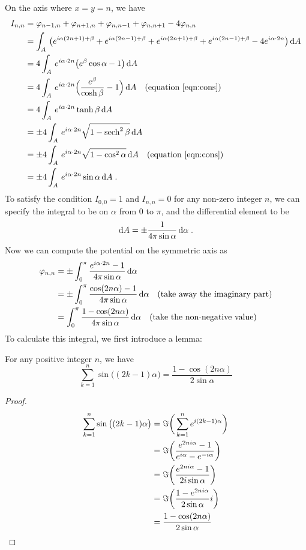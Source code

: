 \documentclass[10pt,a4paper,draft]{article}
\begin{document}
	 On the axis where $x=y=n$, we have
	\begin{align*}
	I_{n,n}&=\varphi_{n-1,n}+\varphi_{n+1,n}+\varphi_{n,n-1}+\varphi_{n,n+1}-4\varphi_{n,n}\\
	&=\int_A \,\big(e^{i\alpha(2n+1)+\beta}+e^{i\alpha(2n-1)+\beta}+e^{i\alpha(2n+1)+\beta}+e^{i\alpha(2n-1)+\beta}-4e^{i\alpha\cdot 2n}\big)\,\mathrm{d} A\\
	&=4\int_A\,e^{i\alpha\cdot 2n}\big(e^\beta\cos\alpha -1\big)\,\mathrm{d} A\\
	&=4\int_A\,e^{i\alpha\cdot 2n}\Big(\frac{e^\beta}{\cosh\beta} -1\Big)\,\mathrm{d} A\quad\textrm{(equation~\eqref{eqn:cons})}\\
	&=4\int_A\,e^{i\alpha\cdot 2n}\tanh\beta\,\mathrm{d} A\\
	&=\pm4\int_A\,e^{i\alpha\cdot 2n}\sqrt{1-\operatorname{sech}^2\beta}\,\mathrm{d} A\\
	&=\pm4\int_A\,e^{i\alpha\cdot 2n}\sqrt{1-\cos^2\alpha}\,\mathrm{d} A\quad\textrm{(equation~\eqref{eqn:cons})}\\
	&=\pm4\int_A\,e^{i\alpha\cdot 2n}\sin\alpha\,\mathrm{d} A\;.
	\end{align*}
	To satisfy the condition $I_{0,0}=1$ and $I_{n,n}=0$ for any non-zero integer $n$, we can specify the integral to be on $\alpha$ from $0$ to $\pi$, and the differential element to be
	\[
	\mathrm{d} A= \pm\frac{1}{4\pi\sin\alpha}\,\mathrm{d}\alpha\;.
	\]
	Now we can compute the potential on the symmetric axis as
	\begin{align*}
	\varphi_{n,n}
	&=\pm\int^\pi_0 \frac{e^{i\alpha\cdot2n}-1}{4\pi\sin\alpha}\,\mathrm{d}\alpha\\
	&=\pm\int^\pi_0 \frac{\cos(2n\alpha)-1}{4\pi\sin\alpha}\,\mathrm{d}\alpha\quad\textrm{(take away the imaginary part)}\\
	&=\int^\pi_0 \frac{1-\cos(2n\alpha)}{4\pi\sin\alpha}\,\mathrm{d}\alpha\quad\textrm{(take the non-negative value)}
	\end{align*}
	To calculate this integral, we first introduce a lemma:
	\begin{lemma}
		\label{lemma:sigmasin}
		For any positive integer $n$, we have
		\[
		\sum_{k=1}^n \sin\big((2k-1)\alpha\big)=\frac{1-\cos(2n\alpha)}{2\sin\alpha}
		\]
	\end{lemma}
	\begin{proof}
		\begin{align*}
		\sum_{k=1}^n \sin\big((2k-1)\alpha\big)&=\Im\bigg(\sum_{k=1}^n e^{i(2k-1)\alpha}\bigg)\\
		&=\Im\bigg(\frac{e^{2ni\alpha}-1}{e^{i\alpha}-e^{-i\alpha}}\bigg)\\
		&=\Im\bigg(\frac{e^{2ni\alpha}-1}{2i\sin\alpha}\bigg)\\
		&=\Im\bigg(\frac{1-e^{2ni\alpha}}{2\sin\alpha}i\bigg)\\
		&=\frac{1-\cos (2n\alpha)}{2\sin\alpha}\qedhere
		\end{align*}
	\end{proof}
\end{document}
